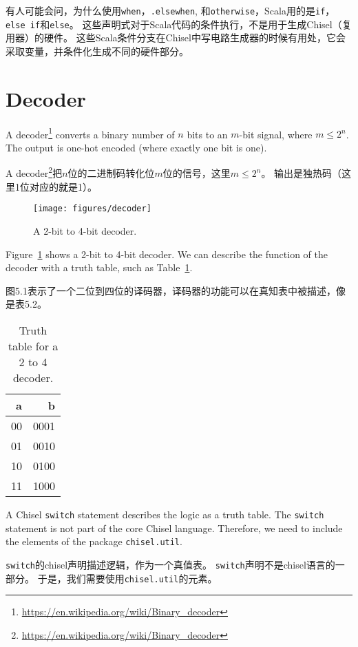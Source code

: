 \documentclass[%
    10pt,
    headinclude, footexclude,
    openright, %
    notitlepage,
    cleardoubleempty,
    headsepline,
    pointlessnumbers,
    bibtotoc, idxtotoc,
    ]{scrbook}
\newcommand{\code}[1]{{\small{\texttt{#1}}}}
\newcommand{\scale}{0.7}
\newcommand{\myref}[2]{\href{#1}{#2}}
\renewcommand{\myref}[2]{{#2}{\footnote{\url{#1}}}}
\begin{document}
有人可能会问，为什么使用\code{when}，\code{.elsewhen}, 和\code{otherwise}，Scala用的是\code{if}，\code{else if}和\code{else}。
这些声明式对于Scala代码的条件执行，不是用于生成Chisel（复用器）的硬件。
这些Scala条件分支在Chisel中写电路生成器的时候有用处，它会采取变量，并条件化生成不同的硬件部分。


\section{Decoder}

A \myref{https://en.wikipedia.org/wiki/Binary_decoder}{decoder}
converts a binary number of $n$ bits to an $m$-bit signal, where $m \leq 2^n$.
The output is one-hot encoded (where exactly one bit is one).


A \myref{https://en.wikipedia.org/wiki/Binary_decoder}{decoder}把$n$位的二进制码转化位$m$位的信号，这里$m \leq 2^n$。
输出是独热码（这里1位对应的就是1）。

\begin{figure}
  \centering
  \texttt{[image: figures/decoder]}
  \caption{A 2-bit to 4-bit decoder.}
  \label{fig:decoder}
\end{figure}

Figure~\ref{fig:decoder} shows a 2-bit to 4-bit decoder. We can describe the function
of the decoder with a truth table, such as Table~\ref{tab:decoder}.

图5.1表示了一个二位到四位的译码器，译码器的功能可以在真知表中被描述，像是表5.2。

\begin{table}
 \centering
 \label{tab:decoder}
  \begin{tabular}{rr}
    \toprule
    a & b \\
    \midrule
    00 & 0001 \\
    01 & 0010 \\
    10 & 0100 \\
    11 & 1000 \\
    \bottomrule 
  \end{tabular} 
  \caption{Truth table for a 2 to 4 decoder.}
\end{table}

A Chisel \code{switch} statement describes the logic as a truth table.
The \code{switch} statement is not part of the core Chisel language.
Therefore, we need to include the elements of the package \code{chisel.util}.

\code{switch}的chisel声明描述逻辑，作为一个真值表。
\code{switch}声明不是chisel语言的一部分。
于是，我们需要使用\code{chisel.util}的元素。
\end{document}
